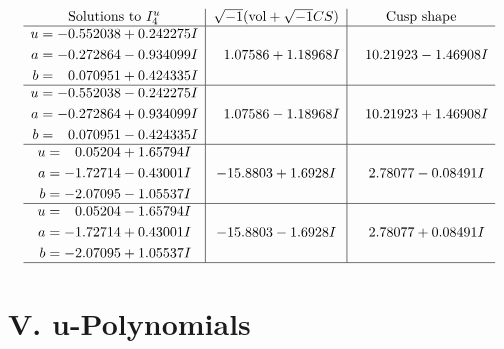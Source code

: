 \documentclass[1p]{elsarticle_modified}
\theoremstyle{definition}
\newcommand{\I}{\sqrt{-1}}
\begin{document}
$$\begin{array}{c|c|c}  
\text{Solutions to }I^u_{4}& \I (\text{vol} + \sqrt{-1}CS) & \text{Cusp shape}\\
 \hline 
\begin{aligned}
u &= -0.552038 + 0.242275 I \\
a &= -0.272864 - 0.934099 I \\
b &= \phantom{-}0.070951 + 0.424335 I\end{aligned}
 & \phantom{-}1.07586 + 1.18968 I & \phantom{-}10.21923 - 1.46908 I \\ \hline\begin{aligned}
u &= -0.552038 - 0.242275 I \\
a &= -0.272864 + 0.934099 I \\
b &= \phantom{-}0.070951 - 0.424335 I\end{aligned}
 & \phantom{-}1.07586 - 1.18968 I & \phantom{-}10.21923 + 1.46908 I \\ \hline\begin{aligned}
u &= \phantom{-}0.05204 + 1.65794 I \\
a &= -1.72714 - 0.43001 I \\
b &= -2.07095 - 1.05537 I\end{aligned}
 & -15.8803 + 1.6928 I & \phantom{-}2.78077 - 0.08491 I \\ \hline\begin{aligned}
u &= \phantom{-}0.05204 - 1.65794 I \\
a &= -1.72714 + 0.43001 I \\
b &= -2.07095 + 1.05537 I\end{aligned}
 & -15.8803 - 1.6928 I & \phantom{-}2.78077 + 0.08491 I\\
 \hline 
 \end{array}$$\newpage
\newpage\renewcommand{\arraystretch}{1}
\centering \section*{ V. u-Polynomials}
\end{document}
